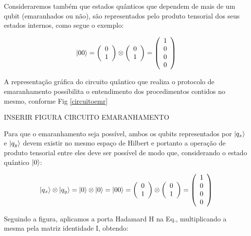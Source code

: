 \documentclass[11pt,oneside,brazil,hidelinks,article,sumario=tradicional,a4paper]{abntex2}
\begin{document}
Consideraremos também que estados quânticos que dependem de mais de um qubit (emaranhados ou não), são representados pelo produto tensorial dos seus estados internos, como segue o exemplo:

\begin{equation}\label{00}
\ket{00} = \left(\begin{array}{l}
0 \\
1
\end{array}\right) \otimes \left(\begin{array}{l}
0 \\
1
\end{array}\right) = \left(\begin{array}{l}
1 \\
0 \\
0 \\
0
\end{array}\right)
\end{equation}

A representação gráfica do circuito quântico que realiza o protocolo de emaranhamento possibilita o entendimento dos procedimentos contidos no mesmo, conforme Fig \ref{circuitoemr}

INSERIR FIGURA CIRCUITO EMARANHAMENTO

Para que o emaranhamento seja possível, ambos os qubits representados por $\ket{q_x}$ e $\ket{q_y}$ devem existir no mesmo espaço de Hilbert e portanto a operação de produto tensorial entre eles deve ser possível de modo que, considerando o estado quântico $\ket{0}$:

\begin{equation}
\ket{q_x} \otimes \ket{q_y} = \ket{0} \otimes \ket{0} = \ket{00} = \left(\begin{array}{l}
0 \\
1
\end{array}\right) \otimes \left(\begin{array}{l}
0 \\
1
\end{array}\right) = \left(\begin{array}{l}
1 \\
0 \\
0 \\
0
\end{array}\right)
\end{equation}

Seguindo a figura, aplicamos a porta Hadamard H na Eq., multiplicando a mesma pela matriz identidade I, obtendo:
\end{document}

